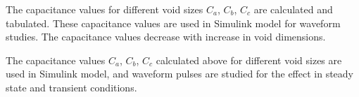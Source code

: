 The capacitance values for different void sizes $C_a$, $C_b$, $C_c$ are calculated and tabulated. These capacitance values are used in Simulink model for waveform studies. The capacitance values decrease with increase in void dimensions.

The capacitance values $C_a$, $C_b$, $C_c$ calculated above for different void sizes are used in Simulink model, and waveform pulses are studied for the effect in steady state and transient conditions. 

\restoregeometry